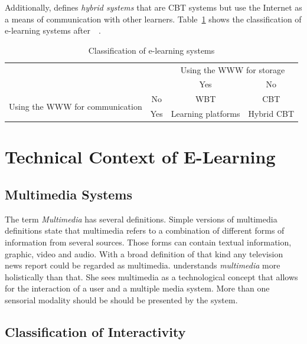 Additionally,  \citeyear{Richert2007} defines
\emph{hybrid systems} that are CBT systems but use the Internet as a means of
communication with other learners.
Table~\ref{table:elearningsystems} shows the classification of e-learning systems
after~~\citeyear{Richert2007}.
\begin{table}[htbp]
\begin{center}
\begin{tabular}{|c|c|c|c|}
  \hline
  \multicolumn{2}{|c|}{} & \multicolumn{2}{|c|}{Using the WWW for storage} \\
  \cline{3-4}
  \multicolumn{2}{|c|}{} & Yes & No \\
  \hline
  \multirow{2}{*}{Using the WWW for communication} & No & WBT & CBT \\
  \cline{2-4}
   & Yes & Learning platforms & Hybrid CBT \\
  \hline
\end{tabular}
\caption{Classification of e-learning systems}
\label{table:elearningsystems}
\end{center}
\end{table}

\section{Technical Context of E-Learning}
\label{sec:elearn:technicalcontext}

\subsection{Multimedia Systems}
\label{sec:elearn:multimediasystems}

The term \emph{Multimedia} has several definitions. Simple versions of 
multimedia definitions state that multimedia refers to a combination of
different forms of information from several sources. Those forms can contain
textual information, graphic, video and audio. With a broad definition
of that kind any television news report could be regarded as multimedia.
 \citeyear{Richert2007} understands \emph{multimedia}
more holistically than that. She sees multimedia as a technological concept 
that allows for the interaction of a user and a multiple media system.
More than one sensorial modality should be should be presented by the system.

\subsection{Classification of Interactivity}
\label{sec:elearn:interactivity}

